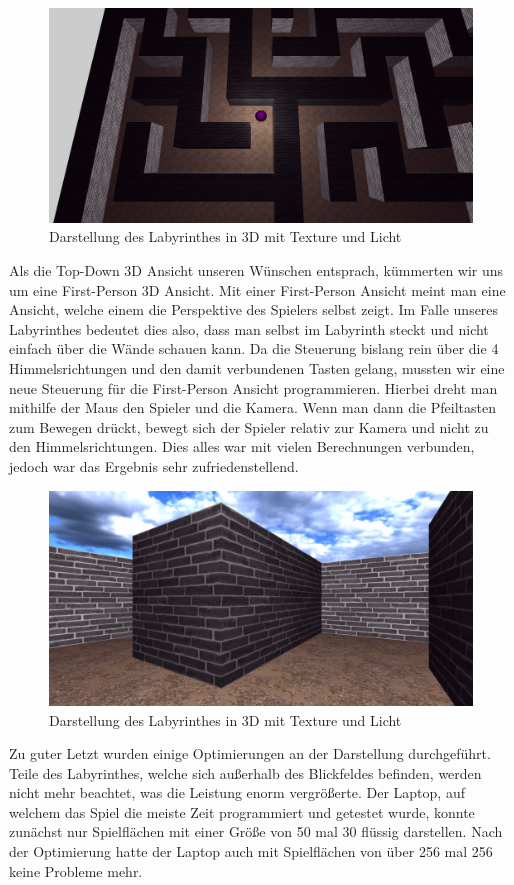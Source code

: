 \begin{figure}[hbtp!]
    \centering
    \includegraphics[width=\paperwidth-3in]{../assets/img/Fr3DTopDownTexture.PNG}
    \caption{Darstellung des Labyrinthes in 3D mit Texture und Licht}
    \label{fig:Fr3DTopDownTexture}
\end{figure}

Als die Top-Down 3D Ansicht unseren Wünschen entsprach, kümmerten wir uns um eine First-Person 3D Ansicht. Mit einer First-Person Ansicht meint man eine Ansicht, welche einem die Perspektive des Spielers selbst zeigt. Im Falle unseres Labyrinthes bedeutet dies also, dass man selbst im Labyrinth steckt und nicht einfach über die Wände schauen kann.
Da die Steuerung bislang rein über die 4 Himmelsrichtungen und den damit verbundenen Tasten gelang, mussten wir eine neue Steuerung für die First-Person Ansicht programmieren. Hierbei dreht man mithilfe der Maus den Spieler und die Kamera. Wenn man dann die Pfeiltasten zum Bewegen drückt, bewegt sich der Spieler relativ zur Kamera und nicht zu den Himmelsrichtungen. Dies alles war mit vielen Berechnungen verbunden, jedoch war das Ergebnis sehr zufriedenstellend.

\begin{figure}[h!]
    \centering
    \includegraphics[width=\paperwidth-3in]{../assets/img/Fr3DFirstPersonTexture.PNG}
    \caption{Darstellung des Labyrinthes in 3D mit Texture und Licht}
    \label{fig:Fr3DFirstPersonTexture}
\end{figure}

Zu guter Letzt wurden einige Optimierungen an der Darstellung durchgeführt. Teile des Labyrinthes, welche sich außerhalb des Blickfeldes befinden, werden nicht mehr beachtet, was die Leistung enorm vergrößerte. Der Laptop, auf welchem das Spiel die meiste Zeit programmiert und getestet wurde, konnte zunächst nur Spielflächen mit einer Größe von 50 mal 30 flüssig darstellen. Nach der Optimierung hatte der Laptop auch mit Spielflächen von über 256 mal 256 keine Probleme mehr. 
